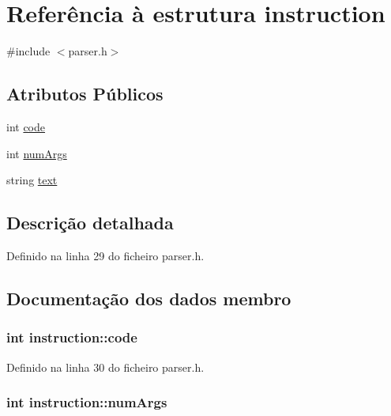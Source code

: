 \hypertarget{structinstruction}{\section{Referência à estrutura instruction}
\label{structinstruction}
}


{\ttfamily \#include $<$parser.\-h$>$}

\subsection*{Atributos Públicos}
\begin{DoxyCompactItemize}
\item 
int \hyperlink{structinstruction_a20ba1219d473773f35384214c08f717c}{code}
\item 
int \hyperlink{structinstruction_abb5712c98f149b197b5c58b2dac15a03}{num\-Args}
\item 
string \hyperlink{structinstruction_af31af10ecfe7d2fdf154616d0aede8ea}{text}
\end{DoxyCompactItemize}


\subsection{Descrição detalhada}


Definido na linha 29 do ficheiro parser.\-h.



\subsection{Documentação dos dados membro}
\hypertarget{structinstruction_a20ba1219d473773f35384214c08f717c}{
\subsubsection[{code}]{\setlength{\rightskip}{0pt plus 5cm}int instruction\-::code}}\label{structinstruction_a20ba1219d473773f35384214c08f717c}


Definido na linha 30 do ficheiro parser.\-h.

\hypertarget{structinstruction_abb5712c98f149b197b5c58b2dac15a03}{
\subsubsection[{num\-Args}]{\setlength{\rightskip}{0pt plus 5cm}int instruction\-::num\-Args}}\label{structinstruction_abb5712c98f149b197b5c58b2dac15a03}



